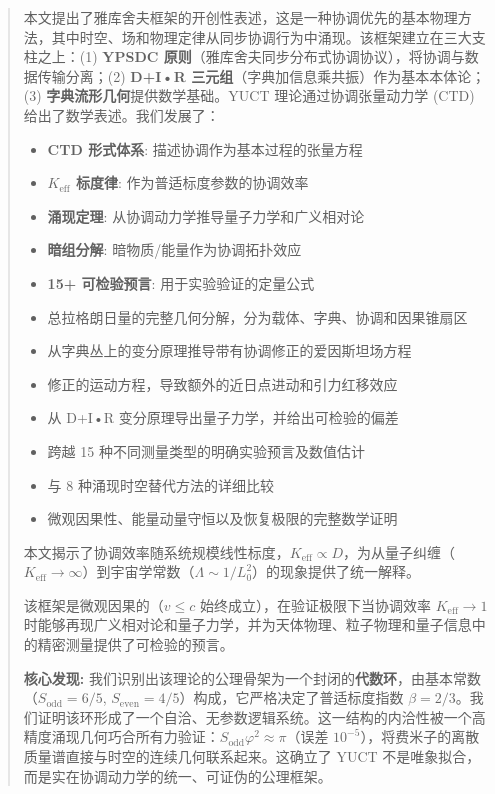 \documentclass[11pt,a4paper]{article}
\begin{document}
	\begin{abstract}
		本文提出了雅库舍夫框架的开创性表述，这是一种协调优先的基本物理方法，其中时空、场和物理定律从同步协调行为中涌现。该框架建立在三大支柱之上：(1) \textbf{YPSDC 原则}（雅库舍夫同步分布式协调协议），将协调与数据传输分离；(2) \textbf{D+I•R 三元组}（字典加信息乘共振）作为基本本体论；(3) \textbf{字典流形几何}提供数学基础。YUCT 理论通过协调张量动力学 (CTD) 给出了数学表述。我们发展了：
		\begin{itemize}
			\item \textbf{CTD 形式体系}: 描述协调作为基本过程的张量方程
			\item \textbf{$K_{\mathrm{eff}}$ 标度律}: 作为普适标度参数的协调效率
			\item \textbf{涌现定理}: 从协调动力学推导量子力学和广义相对论
			\item \textbf{暗组分解}: 暗物质/能量作为协调拓扑效应
			\item \textbf{15+ 可检验预言}: 用于实验验证的定量公式
			\item 总拉格朗日量的完整几何分解，分为载体、字典、协调和因果锥扇区
			\item 从字典丛上的变分原理推导带有协调修正的爱因斯坦场方程
			\item 修正的运动方程，导致额外的近日点进动和引力红移效应
			\item 从 D+I•R 变分原理导出量子力学，并给出可检验的偏差
			\item 跨越 15 种不同测量类型的明确实验预言及数值估计
			\item 与 8 种涌现时空替代方法的详细比较
			\item 微观因果性、能量动量守恒以及恢复极限的完整数学证明
		\end{itemize}
		本文揭示了协调效率随系统规模线性标度，$K_{\mathrm{eff}} \propto D$，为从量子纠缠（$K_{\mathrm{eff}} \to \infty$）到宇宙学常数（$\Lambda \sim 1/L_0^2$）的现象提供了统一解释。
		
		该框架是微观因果的（$v \leq c$ 始终成立），在验证极限下当协调效率 $K_{\mathrm{eff}} \to 1$ 时能够再现广义相对论和量子力学，并为天体物理、粒子物理和量子信息中的精密测量提供了可检验的预言。
		
		\vspace{0.5em}
		\noindent \textbf{核心发现:} 
		我们识别出该理论的公理骨架为一个封闭的\textbf{代数环}，由基本常数（$S_{\mathrm{odd}} = 6/5$, $S_{\mathrm{even}} = 4/5$）构成，它严格决定了普适标度指数 $\beta = 2/3$。我们证明该环形成了一个自洽、无参数逻辑系统。这一结构的内洽性被一个高精度涌现几何巧合所有力验证：$S_{\mathrm{odd}}\varphi^2 \approx \pi$（误差 $10^{-5}$），将费米子的离散质量谱直接与时空的连续几何联系起来。这确立了 YUCT 不是唯象拟合，而是实在协调动力学的统一、可证伪的公理框架。
		
	\end{abstract}
	
\end{document}
